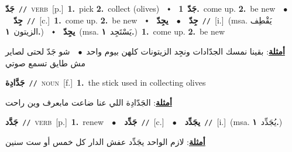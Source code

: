 \documentclass[10pt,a4paper,twoside]{article} %
\begin{document}
\begin{multicols}{2}
{\setlength\topsep{0pt}\textbf{\foreignlanguage{arabic}{جَدّ}}\ {\color{gray}\texttt{//}\color{black}}\ \textsc{verb}\ [p.]\ \textbf{1.}~pick  \textbf{2.}~collect (olives)\ \ $\smblkdiamond$\ \ \setlength\topsep{0pt}\textbf{\foreignlanguage{arabic}{جَدّ}}\ \textbf{1.}~come up.  \textbf{2.}~be new\ \ $\bullet$\ \ \setlength\topsep{0pt}\textbf{\foreignlanguage{arabic}{جِدّ}}\ {\color{gray}\texttt{//}\color{black}}\ [c.]\ \textbf{1.}~come up.  \textbf{2.}~be new\ \ $\smblkdiamond$\ \ \setlength\topsep{0pt}\textbf{\foreignlanguage{arabic}{جِدّ}}\ \ $\bullet$\ \ \setlength\topsep{0pt}\textbf{\foreignlanguage{arabic}{يجِدّ}}\ {\color{gray}\texttt{//}\color{black}}\ [i.]\ \color{gray}(msa. \foreignlanguage{arabic}{يَقْطِف الزيتون}~\foreignlanguage{arabic}{\textbf{١.}})\color{black}\ \ $\smblkdiamond$\ \ \setlength\topsep{0pt}\textbf{\foreignlanguage{arabic}{يجِدّ}}\ \color{gray}(msa. \foreignlanguage{arabic}{يَسْتَجِد}~\foreignlanguage{arabic}{\textbf{١.}})\color{black}\ \textbf{1.}~come up.  \textbf{2.}~be new\  \begin{flushright}\color{gray}\foreignlanguage{arabic}{\textbf{\underline{\foreignlanguage{arabic}{أمثلة}}}: بقينا نمسك الجدّادات ونجِد الزيتونات كلهن بيوم واحد\ $\bullet$\ \  شو جَدّ لحتى لصاير مش طايق تسمع صوتي}\end{flushright}\color{black}} \vspace{2mm}

{\setlength\topsep{0pt}\textbf{\foreignlanguage{arabic}{جَدَّادِة}}\ {\color{gray}\texttt{//}\color{black}}\ \textsc{noun}\ [f.]\ \textbf{1.}~the stick used in collecting olives\  \begin{flushright}\color{gray}\foreignlanguage{arabic}{\textbf{\underline{\foreignlanguage{arabic}{أمثلة}}}: الجَدّادِة اللي  عنا ضاعت مابعرف وين راحت}\end{flushright}\color{black}} \vspace{2mm}

{\setlength\topsep{0pt}\textbf{\foreignlanguage{arabic}{جَدَّد}}\ {\color{gray}\texttt{//}\color{black}}\ \textsc{verb}\ [p.]\ \textbf{1.}~renew\ \ $\bullet$\ \ \setlength\topsep{0pt}\textbf{\foreignlanguage{arabic}{جَدِّد}}\ {\color{gray}\texttt{//}\color{black}}\ [c.]\ \ $\bullet$\ \ \setlength\topsep{0pt}\textbf{\foreignlanguage{arabic}{يجَدِّد}}\ {\color{gray}\texttt{//}\color{black}}\ [i.]\ \color{gray}(msa. \foreignlanguage{arabic}{يُجَدِّد}~\foreignlanguage{arabic}{\textbf{١.}})\color{black}\  \begin{flushright}\color{gray}\foreignlanguage{arabic}{\textbf{\underline{\foreignlanguage{arabic}{أمثلة}}}: لازم الواحد يجَدِّد عفش الدار كل خمس أو ست سنين}\end{flushright}\color{black}} \vspace{2mm}


\end{multicols}
\end{document}
